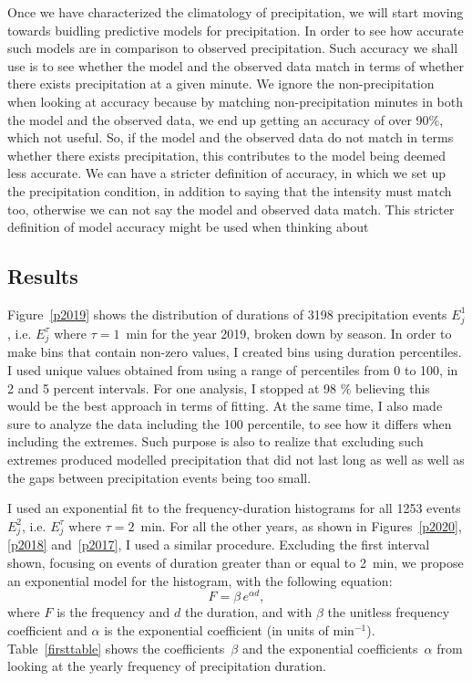 \documentclass[11pt]{report}
\begin{document}
Once we have characterized the climatology of precipitation, we will start
moving towards buidling predictive models for precipitation. In order to see
how accurate such models are in comparison to observed precipitation. Such
accuracy we shall use is to see whether the model and the observed data
match in terms of whether there exists precipitation at a given minute. We
ignore the non-precipitation when looking at accuracy because by matching
non-precipitation minutes in both the model and the observed data, we end up
getting an accuracy of over 90\%, which not useful. So, if the model and the
observed data do not match in terms whether there exists precipitation, this
contributes to the model being deemed less accurate. We can have a stricter
definition of accuracy, in which we set up the precipitation condition, in
addition to saying that the intensity must match too, otherwise we can not
say the model and observed data match. This stricter definition of model
accuracy might be used when thinking about

\subsection{Results}\label{sec:apcr}

Figure~\ref{p2019} shows the distribution of durations of 3198 precipitation
events $E_j^1$, i.e. $E_j^\tau$ where $\tau=1$~min for the year 2019, broken
down by season. In order to make bins that contain non-zero values, I
created bins using duration percentiles. I used unique values obtained from
using a range of percentiles from 0 to 100, in 2 and 5 percent
intervals. For one analysis, I stopped at 98 \% believing this would be the
best approach in terms of fitting. At the same time, I also made sure to
analyze the data including the 100 percentile, to see how it differs when
including the extremes. Such purpose is also to realize that excluding such
extremes produced modelled precipitation that did not last long as well as
well as the gaps between precipitation events being too small.

I used an exponential fit to the frequency-duration histograms for all 1253
events $E_j^2$, i.e. $E_j^\tau$ where $\tau=2$~min. For all the other years,
as shown in Figures~\ref{p2020}, \ref{p2018} and~\ref{p2017}, I used a
similar procedure. Excluding the first interval shown, focusing on events of duration
greater than or equal to 2~min, we propose an exponential model for
the histogram, with the following equation:
\begin{equation}\label{expod}
  F = \beta \,e^{\alpha d},
\end{equation}
where $F$ is the frequency and $d$ the duration, and with $\beta$ the
unitless frequency coefficient and $\alpha$ is the exponential coefficient
(in units of min$^{-1}$). Table~\ref{firsttable} shows the
coefficients~$\beta$ and the exponential coefficients~$\alpha$ from looking
at the yearly frequency of precipitation duration.
\end{document}
